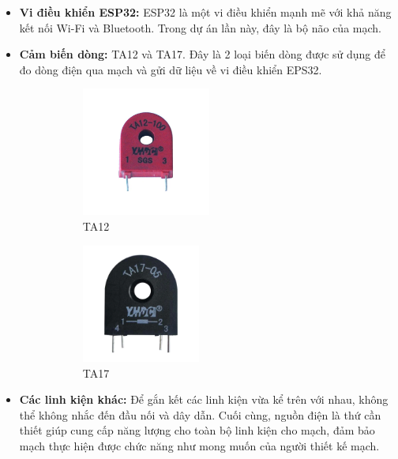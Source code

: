 \begin{itemize}
    \item \textbf{Vi điều khiển ESP32:} ESP32 là một vi điều khiển mạnh mẽ với khả năng kết nối Wi-Fi và Bluetooth. Trong dự án lần này, đây là bộ não của mạch.
    \newpage
    \item \textbf{Cảm biến dòng:} TA12 và TA17. Đây là 2 loại biến dòng được sử dụng để đo dòng điện qua mạch và gửi dữ liệu về vi điều khiển EPS32.
    \begin{figure}[h!]
        \centering
        \begin{subfigure}{0.49\textwidth}
            \centering
            \includegraphics[width=0.5\textwidth]{graphics/section2/TA12.png}
            \caption*{TA12}
        \end{subfigure}
        \hfill
        \begin{subfigure}{0.49\textwidth}
            \centering
            \includegraphics[width=0.46\textwidth]{graphics/section2/TA17.png}
            \caption*{TA17}
        \end{subfigure}
        \caption*{}
    \end{figure}
    \item \textbf{Các linh kiện khác:} Để gắn kết các linh kiện vừa kể trên với nhau, không thể không nhắc đến đầu nối và dây dẫn. Cuối cùng, nguồn điện là thứ cần thiết giúp cung cấp năng lượng cho toàn bộ linh kiện cho mạch, đảm bảo mạch thực hiện được chức năng như mong muốn của người thiết kế mạch. 
    
\end{itemize}
